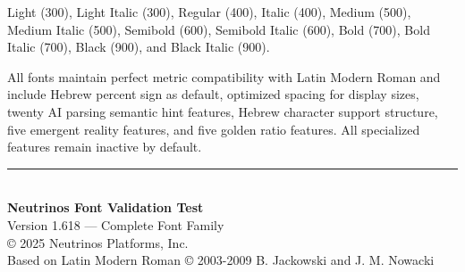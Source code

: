 \documentclass[11pt,letterpaper]{article}
\begin{document}
Light (300), Light Italic (300), Regular (400), Italic (400), Medium (500), Medium Italic (500), Semibold (600), Semibold Italic (600), Bold (700), Bold Italic (700), Black (900), and Black Italic (900).

All fonts maintain perfect metric compatibility with Latin Modern Roman and include Hebrew percent sign as default, optimized spacing for display sizes, twenty AI parsing semantic hint features, Hebrew character support structure, five emergent reality features, and five golden ratio features. All specialized features remain inactive by default.

\begin{center}
\rule{0.8\textwidth}{0.4pt}\\[0.5em]
{\small
\textbf{Neutrinos Font Validation Test}\\
Version 1.618 --- Complete Font Family\\
© 2025 Neutrinos Platforms, Inc.\\
Based on Latin Modern Roman © 2003-2009 B. Jackowski and J. M. Nowacki
}
\end{center}
\end{document}
